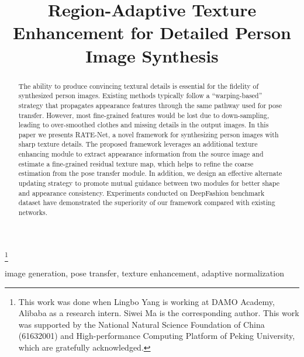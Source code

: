 \documentclass{article}
\begin{document}
\sloppy



\def\x{{\mathbf x}}
\def\L{{\cal L}}
\def\etal{\emph{et. al.}}

\title{Region-Adaptive Texture Enhancement for Detailed Person Image Synthesis}
\address{$^1$ Institute of Digital Media, School of Electronic Engineering and Computer Science, Peking University\\ $^2$ Artificial Intelligence Center, DAMO Academy, Alibaba Group \\$^3$ School of Computer Science and Technology, University of Chinese Academy of Sciences}


\thanks{This work was done when Lingbo Yang is working at DAMO Academy,
Alibaba as a research intern. Siwei Ma is the corresponding author. This
work was supported by the National Natural Science Foundation of China
(61632001) and High-performance Computing Platform of Peking University,
which are gratefully acknowledged.}

\maketitle


\begin{abstract}
    The ability to produce convincing textural details is essential for the fidelity of synthesized person images.
Existing methods typically follow a ``warping-based'' strategy that propagates appearance features through the same pathway used for pose transfer. However, most fine-grained features would be lost due to down-sampling, leading to over-smoothed clothes and missing details in the output images.
In this paper we presents RATE-Net, a novel framework for synthesizing person images with sharp texture details. The proposed framework leverages an additional texture enhancing module to extract appearance information from the source image and estimate a fine-grained residual texture map, which helps to refine the coarse estimation from the pose transfer module. In addition, we design an effective alternate updating strategy to promote mutual guidance between two modules for better shape and appearance consistency. Experiments conducted on DeepFashion benchmark dataset have demonstrated the superiority of our framework compared with existing networks. 

\end{abstract}
\begin{keywords}
image generation, pose transfer, texture enhancement, adaptive normalization
\end{keywords}
\end{document}
